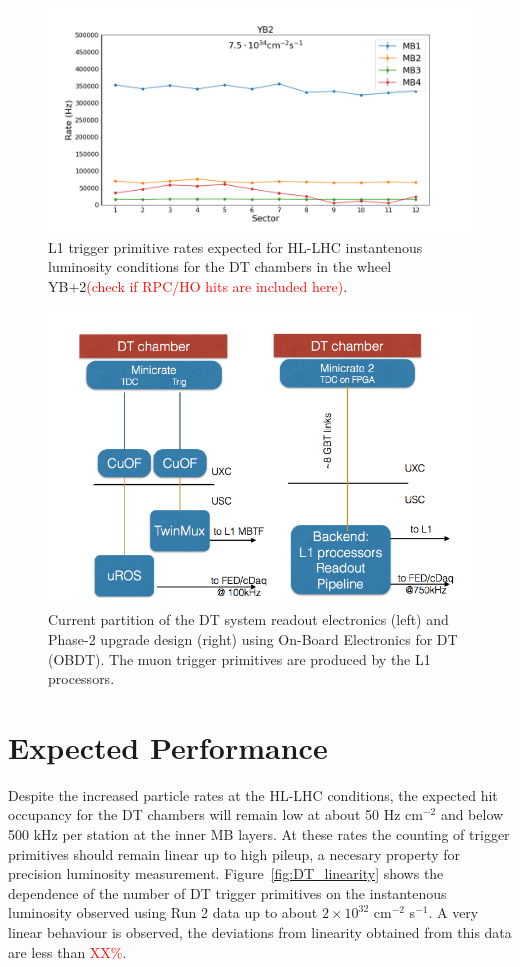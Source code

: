 \begin{figure}[hbtp]
\centering
\includegraphics[width=.8\linewidth]{tex/Part2/fig/DT/DT-RatesExtrapolated.png}
\caption{L1 trigger primitive rates expected for HL-LHC instantenous luminosity conditions for the DT chambers in the wheel YB+2\textcolor{red}{(check if RPC/HO hits are included here)}.} 
\label{fig:DT_rates}
\end{figure}

\begin{figure}[hbtp]
\centering
\includegraphics[width=.7\linewidth]{tex/Part2/fig/DT/DT-DAQ-Phase1_vs_Phase2.png}
\caption{Current partition of the DT system readout electronics (left) and Phase-2 upgrade design (right) using On-Board Electronics for DT (OBDT).
  The muon trigger primitives are produced by the L1 processors.
}   
\label{fig:DT_DAQ2}
\end{figure}


\clearpage

\section{Expected Performance}

Despite the increased particle rates at the HL-LHC conditions, the expected hit occupancy for the DT chambers will remain low at about 50 Hz cm$^{-2}$
and below 500 kHz per station at the inner MB layers.
At these rates the counting of trigger primitives should remain linear up to high pileup, a necesary property for precision luminosity measurement.
Figure~\ref{fig:DT_linearity} shows the dependence of the number of DT trigger primitives on the instantenous luminosity
observed using Run 2 data up to about $2\times10^{32}$ cm$^{-2}$ s$^{-1}$.
A very linear behaviour is observed, the deviations from linearity obtained from this data are less than \textcolor{red}{ XX\%}.

